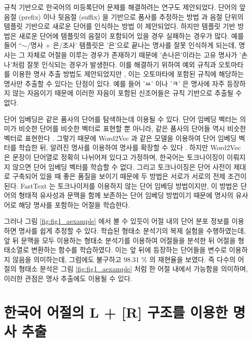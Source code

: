 \documentclass[oneside, ko,phd]{snuthesis_utf8_kor}
\begin{document}
규칙 기반으로 한국어의 미등록단어 문제를 해결하려는 연구도 제안되었다.
단어의 앞음절 (prefix) 이나 뒷음절 (suffix) 을 기반으로 품사를 추정하는 방법 \cite{Lee2016functional} 과 음절 단위의 템플릿 기반으로 새로운 단어를 인식하는 방법 \cite{hong2008new} 이 제안되었다.
하지만 템플릿 기반 방법은 새로운 단어에 템플릿의 음절이 포함되어 있을 경우 실패하는 경우가 많다.
예를 들어 “$\sim$/명사 + 은/조사' 템플릿은 '은'으로 끝나는 명사를 잘못 인식하게 되는데, 명사는 그 자체로 어절을 이루는 경우가 존재하기 때문에 '손나은'이라는 고유 명사가 '손나'처럼 잘못 인식되는 경우가 발생한다.
이를 해결하기 위하여 예외 규칙과 오토마타를 이용한 명사 추출 방법도 제안되었지만 \cite{lee2003efficient}, 이는 오토마타에 포함된 규칙에 해당하는 명사만 추출할 수 있다는 단점이 있다.
예를 들어 'ㅆ' 이나 'ㅋ' 은 명사에 자주 등장하지 않는 자음이기 때문에 이러한 자음이 포함된 신조어들은 규칙 기반으로 추출될 수 없다.

단어 임베딩은 같은 품사의 단어를 탐색하는데 이용될 수 있다.
단어 임베딩 벡터는 의미가 비슷한 단어를 비슷한 벡터로 표현할 뿐 아니라, 같은 품사의 단어들 역시 비슷한 벡터로 표현한다 \cite{bengio2003neural}.
그렇기 때문에 Word2Vec 과 같은 모델을 이용하여 단어 임베딩 벡터를 학습한 뒤, 알려진 명사를 이용하여 명사를 확장할 수 있다 \cite{mikolov2013distributed} .
하지만 Word2Vec 은 문장이 단어열로 정확히 나뉘어져 있다고 가정하며, 한국어는 토크나이징이 이뤄지지 않으면 단어 임베딩 벡터를 학습할 수 없다.
그리고 토크나이징은 단어 사전이 제대로 구축되어 있을 때 좋은 품질을 보이기 때문에 두 방법은 서로가 서로의 전제 조건이 된다.
FastText \cite{bojanowski2017enriching} 는 토크나이저를 이용하지 않는 단어 임베딩 방법이지만, 이 방법은 단어의 형태적 유사성과 문맥을 함께 보존하는 단어 임베딩 방법이기 때문에 명사의 유사어로 해당 명사를 포함하는 어절을 학습한다.

그러나 그림 \ref{fig:fig1_aexample} 에서 볼 수 있듯이 어절 내의 단어 분포 정보를 이용하면 명사를 쉽게 추정할 수 있다.
\cite{shim2016cloning} 학습된 형태소 분석기의 복제 실험을 수행하였는데, 앞 뒤 문맥을 모두 이용하는 형태소 분석기를 이용하여 어절들을 분석한 뒤 어절을 형태소열로 변환하는 함수를 학습하였다.
이는 앞 뒤에 등장하는 단어들을 변수로 이용하지 않음을 의미하는데, 그럼에도 불구하고 98.31 \% 의 재현율을 보였다.
즉 다수의 어절의 형태소 분석은 그림 \ref{fig:fig1_aexample} 처럼 한 어절 내에서 가능함을 의미하며, 이러한 관점은 명사 추출에도 이용될 수 있다.


\section{한국어 어절의 L + [R] 구조를 이용한 명사 추출}
\end{document}

